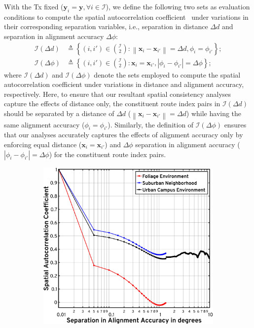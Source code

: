 \documentclass[10pt, twocolumn]{IEEEtran}
\newcommand{\abs}[1]{\left\lvert#1\right\rvert}
\newcommand{\norm}[1]{\left\lVert#1\right\rVert}
\begin{document}
{With the Tx fixed ($\mathbf{y}_{i} = \mathbf{y}, \forall i \in \mathcal{I}$), we define the following two sets as evaluation conditions to compute the spatial autocorrelation coefficient~\cite{MacCartneySpatialStatistics} under variations in their corresponding separation variables, i.e., separation in distance $\Delta d$ and separation in alignment accuracy $\Delta \phi$:
\begin{align}\label{E}
    \mathcal{I}(\Delta d) &\triangleq \left\{(i,i') \in \binom{\mathcal{I}}{2}: \norm{\mathbf{x}_{i} - \mathbf{x}_{i'}} = \Delta d, \phi_{i} = \phi_{i'}\right\};\\
    \mathcal{I}(\Delta \phi) &\triangleq \left\{(i,i') \in \binom{\mathcal{I}}{2}: \mathbf{x}_{i} = \mathbf{x}_{i'}, \abs{\phi_{i} - \phi_{i'}} = \Delta \phi\right\}\label{Ea};
\end{align}
where $\mathcal{I}(\Delta d)$ and $\mathcal{I}(\Delta \phi)$ denote the sets employed to compute the spatial autocorrelation coefficient under variations in distance and alignment accuracy, respectively. Here, to ensure that our resultant spatial consistency analyses capture the effects of distance only, the constituent route index pairs in $\mathcal{I}(\Delta d)$ should be separated by a distance of $\Delta d$ ($\norm{\mathbf{x}_{i}{-}\mathbf{x}_{i'}}{=}\Delta d$) while having the same alignment accuracy ($\phi_{i}{=}\phi_{i'}$). Similarly, the definition of $\mathcal{I}(\Delta \phi)$ ensures that our analyses accurately captures the effects of alignment accuracy only by enforcing equal distance ($\mathbf{x}_{i}{=}\mathbf{x}_{i'}$) and $\Delta \phi$ separation in alignment accuracy ($\abs{\phi_{i}{-}\phi_{i'}}{=}\Delta \phi$) for the constituent route index pairs.
\begin{figure} [t]
    \centering
    \begin{subfigure}{0.4925\linewidth}
        \centering
        \includegraphics[width=1.0\linewidth]{figs/spatial_consistency_vs_alignment_accuracy.pdf}

\end{subfigure}
\end{figure}}
\end{document}
